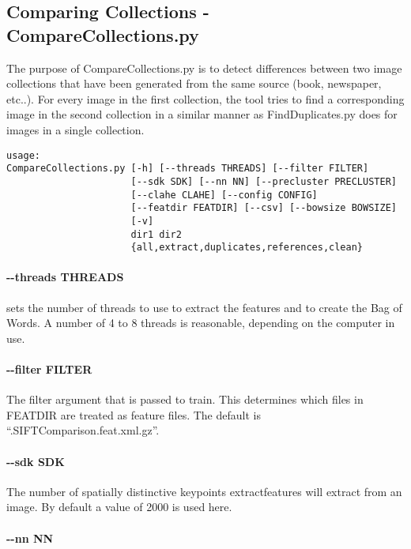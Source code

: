 \subsection{Comparing Collections - CompareCollections.py}

The purpose of {\ttfamily CompareCollections.py} is to detect differences 
between two image collections that have been generated from the same source (book, newspaper, etc..).
For every image in the first collection, the tool tries to find a corresponding image in the second collection
in a similar manner as {\ttfamily FindDuplicates.py} does for images in a single collection.



\begin{verbatim}
usage: 
CompareCollections.py [-h] [--threads THREADS] [--filter FILTER]
                      [--sdk SDK] [--nn NN] [--precluster PRECLUSTER]
                      [--clahe CLAHE] [--config CONFIG]
                      [--featdir FEATDIR] [--csv] [--bowsize BOWSIZE]
                      [-v]
                      dir1 dir2
                      {all,extract,duplicates,references,clean}
\end{verbatim}

\paragraph{\ttfamily -{}-threads THREADS}

sets the number of threads to use to extract the features and to create the Bag
of Words. A number of 4 to 8 threads is reasonable, depending on the computer in use.

\paragraph{\ttfamily -{}-filter FILTER}

The filter argument that is passed to {\ttfamily train}. This determines which files in
FEATDIR are treated as feature files. The default is ``.SIFTComparison.feat.xml.gz''.

\paragraph{\ttfamily -{}-sdk SDK}

The number of spatially distinctive keypoints {\ttfamily extractfeatures} will extract from
an image. By default a value of 2000 is used here.

\paragraph{\ttfamily -{}-nn NN}

